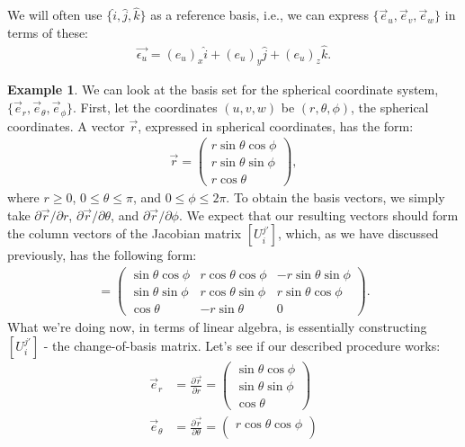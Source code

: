 \documentclass{article}
\theoremstyle{definition}
\newtheorem{exmp}{Example}[section]
\begin{document}
We will often use $\{\hat{i}, \hat{j}, \hat{k} \}$ as a reference basis, i.e., we can express $\{\vec{e}_u, \vec{e}_v ,\vec{e}_w\}$ in terms of these:
\begin{align*}
\vec{\epsilon_u} = (e_u)_x\hat{i} + (e_u)_y\hat{j} + (e_u)_z\hat{k}.
\end{align*}
\begin{exmp}
We can look at the basis set for the spherical coordinate system, $\{\vec{e}_r, \vec{e}_\theta, \vec{e}_\phi \}$. First, let the coordinates $(u,v,w)$ be $(r,\theta,\phi)$, the spherical coordinates. A vector $\vec{r}$, expressed in spherical coordinates, has the form:
\begin{align*}
\vec{r} = 
\begin{pmatrix}
r\sin\theta\cos\phi\\
r\sin\theta\sin\phi\\
r\cos\theta
\end{pmatrix},
\end{align*}
where $r \geq 0$, $0 \leq \theta \leq \pi$, and $0 \leq \phi \leq 2\pi$. To obtain the basis vectors, we simply take $\partial \vec{r}/\partial r$, $\partial \vec{r}/\partial \theta$, and $\partial \vec{r}/\partial \phi$. We expect that our resulting vectors should form the column vectors of the Jacobian matrix $[U^{j'}_i]$, which, as we have discussed previously, has the following form:
\begin{align*}
[U^{j'}_i] = 
\begin{pmatrix}
\sin\theta\cos\phi & r\cos\theta\cos\phi & -r\sin\theta\sin\phi \\
\sin\theta\sin\phi & r\cos\theta\sin\phi & r\sin\theta\cos\phi \\
\cos\theta & -r\sin\theta & 0
\end{pmatrix}.
\end{align*}
What we're doing now, in terms of linear algebra, is essentially constructing $[U^{j'}_i]$ - the change-of-basis matrix. Let's see if our described procedure works:
\begin{align*}
\vec{e}_r &= \frac{\partial \vec{r}}{\partial r} = \begin{pmatrix}
\sin\theta\cos\phi\\
\sin\theta\sin\phi\\
\cos\theta
\end{pmatrix}\\
\vec{e}_\theta &= \frac{\partial \vec{r}}{\partial \theta} = 
\begin{pmatrix}
r\cos\theta\cos\phi\\

\end{pmatrix}
\end{align*}
\end{exmp}
\end{document}

